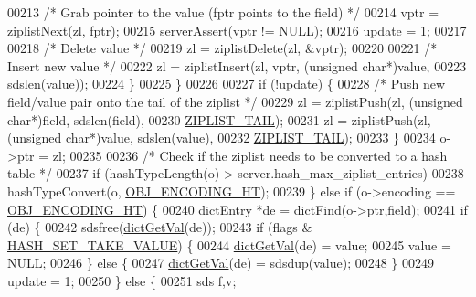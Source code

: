 \begin{DoxyCode}
00213                 \textcolor{comment}{/* Grab pointer to the value (fptr points to the field) */}
00214                 vptr = ziplistNext(zl, fptr);
00215                 \hyperlink{server_8h_a88114b5169b4c382df6b56506285e56a}{serverAssert}(vptr != NULL);
00216                 update = 1;
00217 
00218                 \textcolor{comment}{/* Delete value */}
00219                 zl = ziplistDelete(zl, &vptr);
00220 
00221                 \textcolor{comment}{/* Insert new value */}
00222                 zl = ziplistInsert(zl, vptr, (\textcolor{keywordtype}{unsigned} \textcolor{keywordtype}{char}*)value,
00223                         sdslen(value));
00224             \}
00225         \}
00226 
00227         \textcolor{keywordflow}{if} (!update) \{
00228             \textcolor{comment}{/* Push new field/value pair onto the tail of the ziplist */}
00229             zl = ziplistPush(zl, (\textcolor{keywordtype}{unsigned} \textcolor{keywordtype}{char}*)field, sdslen(field),
00230                     \hyperlink{ziplist_8h_a25d058a2c2c0db0f131f84d23ede6ba2}{ZIPLIST\_TAIL});
00231             zl = ziplistPush(zl, (\textcolor{keywordtype}{unsigned} \textcolor{keywordtype}{char}*)value, sdslen(value),
00232                     \hyperlink{ziplist_8h_a25d058a2c2c0db0f131f84d23ede6ba2}{ZIPLIST\_TAIL});
00233         \}
00234         o->ptr = zl;
00235 
00236         \textcolor{comment}{/* Check if the ziplist needs to be converted to a hash table */}
00237         \textcolor{keywordflow}{if} (hashTypeLength(o) > server.hash\_max\_ziplist\_entries)
00238             hashTypeConvert(o, \hyperlink{server_8h_a9c10219f68afc557d510d108257d238b}{OBJ\_ENCODING\_HT});
00239     \} \textcolor{keywordflow}{else} \textcolor{keywordflow}{if} (o->encoding == \hyperlink{server_8h_a9c10219f68afc557d510d108257d238b}{OBJ\_ENCODING\_HT}) \{
00240         dictEntry *de = dictFind(o->ptr,field);
00241         \textcolor{keywordflow}{if} (de) \{
00242             sdsfree(\hyperlink{dict_8h_ae8d2cc391873b2bea2b87c4f80f43120}{dictGetVal}(de));
00243             \textcolor{keywordflow}{if} (flags & \hyperlink{server_8h_a6835ddf42816b819b74a677170d6f304}{HASH\_SET\_TAKE\_VALUE}) \{
00244                 \hyperlink{dict_8h_ae8d2cc391873b2bea2b87c4f80f43120}{dictGetVal}(de) = value;
00245                 value = NULL;
00246             \} \textcolor{keywordflow}{else} \{
00247                 \hyperlink{dict_8h_ae8d2cc391873b2bea2b87c4f80f43120}{dictGetVal}(de) = sdsdup(value);
00248             \}
00249             update = 1;
00250         \} \textcolor{keywordflow}{else} \{
00251             sds f,v;

\end{DoxyCode}
